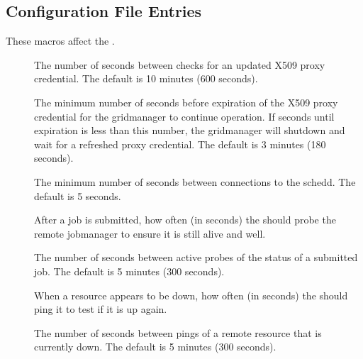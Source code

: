 \subsection{\label{sec:Gridmanager-Config-File-Entries}
 Configuration File Entries}

These macros affect the .
\begin{description}

\item[]
\label{param:GridmanagerCheckproxyInterval} The number of seconds
between checks for an updated X509 proxy credential. The default
is 10 minutes (600 seconds).

\item[]
\label{param:GridmanagerMinimumProxyTime} The minimum number of
seconds before expiration of the X509 proxy credential for the
gridmanager to continue operation. If seconds until expiration is
less than this number, the gridmanager will shutdown and wait for
a refreshed proxy credential. The default is 3 minutes (180 seconds).

\item[]
\label{param:GridmanagerContactScheddDelay} The minimum number of
seconds between connections to the schedd. The default is 5 seconds.

\item[]
\label{param:GridmanagerJobProbeInterval}
After a job is submitted, how often (in seconds) the 
should probe the remote jobmanager to ensure it is still alive and well.

\item[]
\label{param:GridmanagerJobProbeDelay} The number of seconds between
active probes of the status of a submitted job. The default is 5
minutes (300 seconds).

\item[]
\label{param:GridmanagerResourceProbeInterval}
When a resource appears to be down, how often (in seconds) the
should ping it to test if it is up again.

\item[]
\label{param:GridmanagerResourceProbeDelay} The number of seconds
between pings of a remote resource that is currently down. The default
is 5 minutes (300 seconds).


\end{description}
